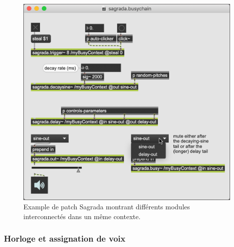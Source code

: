 \begin{figure}[!htbp]
	\captionsetup{format=plain}
	\includegraphics[width=\textwidth]{gfx/04_algorithms/Sagrada-examplePatch.png}
	\caption[Sagrada : exemple de patch]{Example de patch Sagrada montrant différents modules interconnectés dans un même contexte.}
	\label{fig:algorithms:MP-ExamplePatch}
\end{figure}

\subsubsection{Horloge et assignation de voix}

